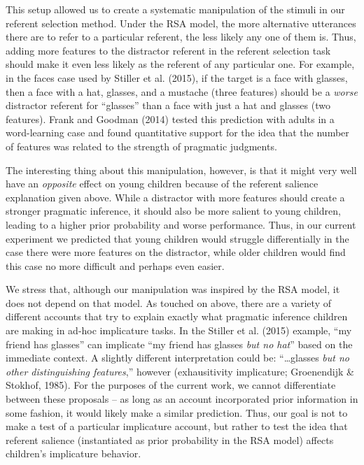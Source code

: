\documentclass[man]{apa6}
\theoremstyle{definition}
\theoremstyle{definition}
\theoremstyle{definition}
\theoremstyle{remark}
\begin{document}
This setup allowed us to create a systematic manipulation of the stimuli
in our referent selection method. Under the RSA model, the more
alternative utterances there are to refer to a particular referent, the
less likely any one of them is. Thus, adding more features to the
distractor referent in the referent selection task should make it even
less likely as the referent of any particular one. For example, in the
faces case used by Stiller et al. (2015), if the target is a face with
glasses, then a face with a hat, glasses, and a mustache (three
features) should be a \emph{worse} distractor referent for
\enquote{glasses} than a face with just a hat and glasses (two
features). Frank and Goodman (2014) tested this prediction with adults
in a word-learning case and found quantitative support for the idea that
the number of features was related to the strength of pragmatic
judgments.

The interesting thing about this manipulation, however, is that it might
very well have an \emph{opposite} effect on young children because of
the referent salience explanation given above. While a distractor with
more features should create a stronger pragmatic inference, it should
also be more salient to young children, leading to a higher prior
probability and worse performance. Thus, in our current experiment we
predicted that young children would struggle differentially in the case
there were more features on the distractor, while older children would
find this case no more difficult and perhaps even easier.

We stress that, although our manipulation was inspired by the RSA model,
it does not depend on that model. As touched on above, there are a
variety of different accounts that try to explain exactly what pragmatic
inference children are making in ad-hoc implicature tasks. In the
Stiller et al. (2015) example, \enquote{my friend has glasses} can
implicate \enquote{my friend has glasses \emph{but no hat}} based on the
immediate context. A slightly different interpretation could be:
\enquote{\ldots{}glasses \emph{but no other distinguishing features},}
however (exhausitivity implicature; Groenendijk \& Stokhof, 1985). For
the purposes of the current work, we cannot differentiate between these
proposals -- as long as an account incorporated prior information in
some fashion, it would likely make a similar prediction. Thus, our goal
is not to make a test of a particular implicature account, but rather to
test the idea that referent salience (instantiated as prior probability
in the RSA model) affects children's implicature behavior.
\end{document}
